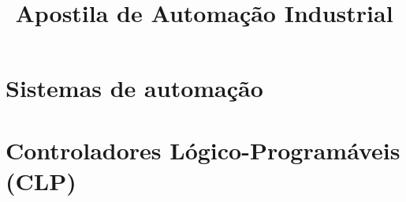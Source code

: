 \documentclass[12pt,oneside]{report}
\title{Apostila de Automação Industrial}
\begin{document}
\maketitle
\tableofcontents
\chapter{Sistemas de automação}



\chapter{Controladores Lógico-Programáveis (CLP)}








%


\end{document}
